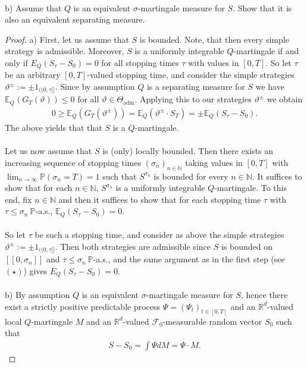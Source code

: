 \documentclass[12pt,a4paper, twoside]{article}
\theoremstyle{definition}
\newcommand{\EE}{\mathbb{E}} %
\newcommand{\PP}{\mathbb{P}} %
\begin{document}
\\
b) Assume that $Q$ is an equivalent $\sigma$-martingale measure for $S$. Show that it is also an equivalent separating measure. 
\begin{proof}
a) First, let us assume that $S$ is bounded. Note, that then every simple strategy is admissible. Moreover, $S$ is a uniformly integrable $Q$-martingale if and only if $E_Q(S_\tau-S_0)=0$ for all stopping times $\tau$ with values in $[0,T]$. So let $\tau$ be an arbitrary $[0,T]$-valued stopping time, and consider the simple strategies $\vartheta^\pm := \pm 1_{(\!(0, \tau]\!]}$. Since by assumption $Q$ is a separating measure for $S$ we have $\EE_Q( G_T( \vartheta)) \leq 0$ for all $\vartheta \in \Theta_\text{adm}$. Applying this to our strategies $\vartheta^\pm$ we obtain 
\begin{align*}
0 \geq \EE_Q( G_T( \vartheta^\pm)) = \EE_Q( \vartheta^\pm \cdot S_T) = \pm \EE_Q(S_\tau-S_0). \tag{$\star$}
\end{align*}
The above yields that that $S$ is a $Q$-martingale. \\
\\
Let us now assume that $S$ is (only) locally bounded. Then there exists an increasing sequence of stopping times $( \sigma_n)_{n \in \mathbb{N}}$ taking values in $[0,T]$ with $\lim_{n \to \infty} \PP( \sigma_n =T)=1$ such that $S^{\sigma_n}$ is bounded for every $n \in \mathbb{N}$. It suffices to show that for each $n \in \mathbb{N}$, $S^{\sigma_n}$ is a uniformly integrable $Q$-martingale.  To this end, fix $n \in \mathbb{N}$ and then it suffices to show that for each stopping time $\tau$ with $\tau \leq \sigma_n \ \PP$-a.s., $\EE_Q(S_\tau-S_0)=0$.\\
\\
So let $\tau$ be such a stopping time,  and consider as above the simple strategies $\vartheta^\pm := \pm 1_{(\!(0, \tau]\!]}.$ Then both strategies are admissible since $S$ is bounded on $[\![0, \sigma_n ]\!]$ and $\tau \leq \sigma_n \ \PP$-a.s., and the same argument as in the first step (see $(\star)$) gives $E_Q(S_\tau-S_0)=0$. 
\\\\
b) By assumption $Q$ is an equivalent $\sigma$-martingale measure for $S$, hence there exist a strictly positive predictable process $\Psi=  (\Psi_t)_{t \in [0,T]}$ and an $\mathbb{R}^d$-valued local $Q$-martingale $M$ and an $\mathbb{R}^d$-valued $\mathcal{F}_0$-measurable random vector $S_0$ such that
\begin{align*}
S-S_0= \int \Psi dM = \Psi \cdot M. 

\end{align*}
\end{proof}
\end{document}
